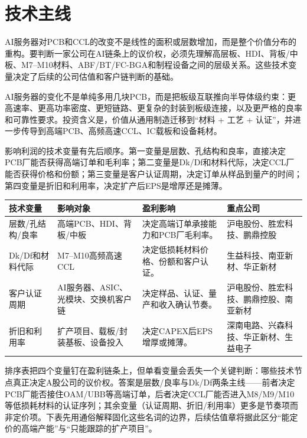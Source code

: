 \section{技术主线}

AI服务器对PCB和CCL的改变不是线性的面积或层数增加，而是整个价值分布的重构。要判断一家公司在AI链条上的议价权，必须先理解高层板、HDI、背板/中板、M7--M10材料、ABF/BT/FC-BGA和制程设备之间的层级关系。这些技术变量决定了后续的公司估值和客户链判断的基础。

\begin{houseviewbox}[技术观点]
AI服务器的变化不是单纯多用几块PCB，而是把板级互联推向半导体级约束：更高速率、更高功率密度、更短链路、更复杂的封装到板级连接，以及更严格的良率和可靠性要求。投资含义是，价值从通用制造迁移到``材料 + 工艺 + 认证''，并进一步传导到高端PCB、高频高速CCL、IC载板和设备耗材。
\end{houseviewbox}

影响利润的技术变量有先后顺序。第一变量是层数、孔结构和良率，直接决定PCB厂能否获得高端订单和毛利率；第二变量是Dk/Df和材料代际，决定CCL厂能否获得价格和份额；第三变量是客户认证周期，决定订单从样品到量产的时间；第四变量是折旧和利用率，决定扩产后EPS是增厚还是摊薄。

\begin{exhibitbox}[图表3-1：技术变量排序与盈利影响]
\small
\begin{tabularx}{\textwidth}{L{2.2cm}X X X}
\toprule
\textbf{技术变量} & \textbf{影响对象} & \textbf{盈利影响} & \textbf{重点公司} \\
\midrule
层数/孔结构/良率 & 高端PCB、HDI、背板/中板 & 决定高端订单承接能力和PCB厂毛利率。 & 沪电股份、胜宏科技、鹏鼎控股 \\
Dk/Df和材料代际 & M7--M10高频高速CCL & 决定低损耗材料价格、份额和客户认证。 & 生益科技、南亚新材、华正新材 \\
客户认证周期 & AI服务器、ASIC、光模块、交换机客户链 & 决定样品、认证、量产和收入确认节奏。 & 沪电股份、胜宏科技、鹏鼎控股、南亚新材 \\
折旧和利用率 & 扩产项目、载板/封装基板、设备投入 & 决定CAPEX后EPS增厚或摊薄。 & 深南电路、兴森科技、华正新材、生益电子 \\
\bottomrule
\end{tabularx}
\end{exhibitbox}

排序表把四个变量钉在盈利链条上，但单看变量会丢失一个关键判断：哪些技术节点真正决定A股公司的议价权。答案是层数/良率与Dk/Df两条主线——前者决定PCB厂能否接住OAM/UBB等高端订单，后者决定CCL厂能否进入M8/M9/M10等低损耗材料的认证序列；其余变量（认证周期、折旧/利用率）更多是节奏项而非定价项。下表先用通俗解释固化这些名词的边界，后续估值章将据此区分``能定价的高端产能''与``只能跟踪的扩产项目''。

